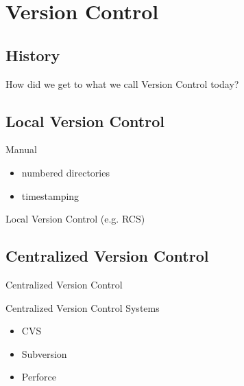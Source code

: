 \documentclass{beamer}
\begin{document}
\section{Version Control}

\subsection{History}

\begin{frame}{How did we get to what we call Version Control today?}
\end{frame}

\subsection{Local Version Control}

\begin{frame}{Manual}
  \begin{itemize}
  \item
    numbered directories
  \item
    timestamping
  \end{itemize}
\end{frame}

\begin{frame}{Local Version Control (e.g. RCS)}
    \centering
    \hfill\vfill
\end{frame}

\subsection{Centralized Version Control}

\begin{frame}{Centralized Version Control}
    \centering
    \hfill\vfill
\end{frame}

\begin{frame}{Centralized Version Control Systems}
  \begin{itemize}
  \item
    CVS
  \item
    Subversion
  \item
    Perforce
  \end{itemize}
\end{frame}
\end{document}
